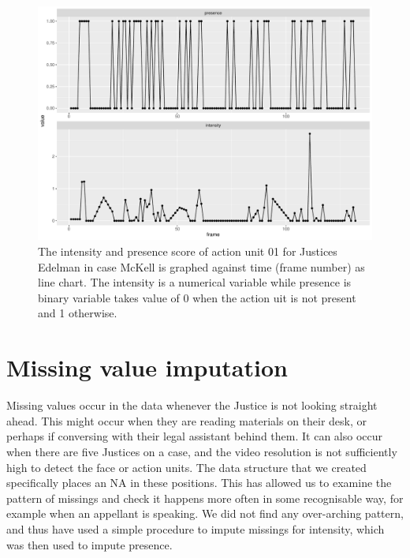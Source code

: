 \documentclass{monashthesis}
\begin{document}
\begin{figure}

{\centering \includegraphics[width=1\linewidth]{figures/ts-plot-1} 

}

\caption{The intensity and presence score of action unit 01 for Justices Edelman in case McKell is graphed against time (frame number) as line chart. The intensity is a numerical variable while presence is binary variable takes value of 0 when the action uit is not present and 1 otherwise.}\label{fig:ts-plot}
\end{figure}

\hypertarget{missing-value-imputation}{%
\section{Missing value imputation}\label{missing-value-imputation}}

Missing values occur in the data whenever the Justice is not looking straight ahead. This might occur when they are reading materials on their desk, or perhaps if conversing with their legal assistant behind them. It can also occur when there are five Justices on a case, and the video resolution is not sufficiently high to detect the face or action units. The data structure that we created specifically places an NA in these positions. This has allowed us to examine the pattern of missings and check it happens more often in some recognisable way, for example when an appellant is speaking. We did not find any over-arching pattern, and thus have used a simple procedure to impute missings for intensity, which was then used to impute presence.
\end{document}
